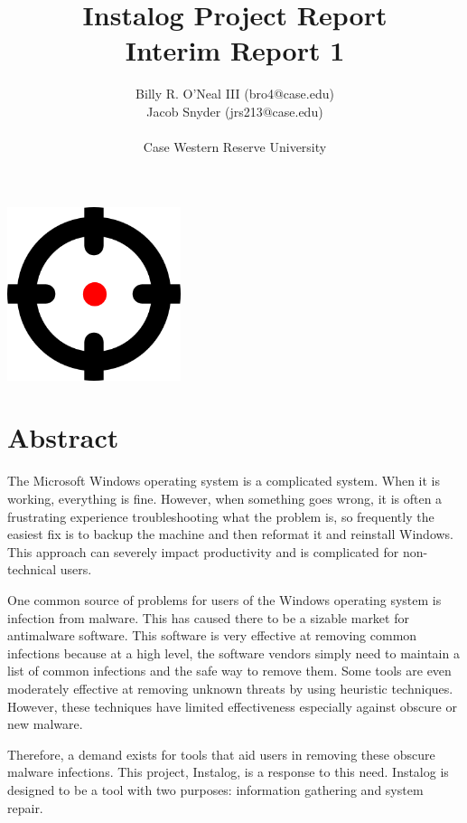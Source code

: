 \documentclass[letterpaper,12pt]{article}
\title{Instalog Project Report \\
Interim Report 1}
\author{
Billy R. O'Neal III (bro4@case.edu) \\
Jacob Snyder (jrs213@case.edu) \\ \\
Case Western Reserve University
}
\begin{document}
\maketitle
\vspace{1in}
\begin{center}
\includegraphics[width=2in, height=2in]{figures/InstalogLogo.png}
\end{center}
\newpage



\tableofcontents
\newpage



\section{Abstract}
The Microsoft Windows operating system is a complicated system.  When it is
working, everything is fine.  However, when something goes wrong, it is often a
frustrating experience troubleshooting what the problem is, so frequently the
easiest fix is to backup the machine and then reformat it and reinstall Windows.
This approach can severely impact productivity and is complicated for
non-technical users.  

One common source of problems for users of the Windows operating system is
infection from malware.  This has caused there to be a sizable market for
antimalware software.  This software is very effective at removing common
infections because at a high level, the software vendors simply need to maintain
a list of common infections and the safe way to remove them.  Some tools are
even moderately effective at removing unknown threats by using heuristic
techniques.  However, these techniques have limited effectiveness especially
against obscure or new malware.  

Therefore, a demand exists for tools that aid users in removing these obscure
malware infections.  This project, Instalog, is a response to this need. 
Instalog is designed to be a tool with two purposes: information gathering and
system repair.
\end{document}
